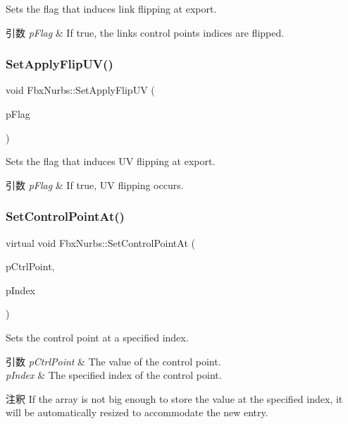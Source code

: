 Sets the flag that induces link flipping at export. 
\begin{DoxyParams}{引数}
{\em p\+Flag} & If {\ttfamily true}, the links control points indices are flipped. \\
\hline
\end{DoxyParams}
\mbox{\label{class_fbx_nurbs_ab5f463575449cbc5734258f061f3c9ba}} 
\subsubsection{\texorpdfstring{Set\+Apply\+Flip\+U\+V()}{SetApplyFlipUV()}}
{\footnotesize\ttfamily void Fbx\+Nurbs\+::\+Set\+Apply\+Flip\+UV (\begin{DoxyParamCaption}\item[{bool}]{p\+Flag }\end{DoxyParamCaption})}

Sets the flag that induces UV flipping at export. 
\begin{DoxyParams}{引数}
{\em p\+Flag} & If {\ttfamily true}, UV flipping occurs. \\
\hline
\end{DoxyParams}
\mbox{\label{class_fbx_nurbs_a46f56bfb4c6ffc90b79b2e0b81c89880}} 
\subsubsection{\texorpdfstring{Set\+Control\+Point\+At()}{SetControlPointAt()}}
{\footnotesize\ttfamily virtual void Fbx\+Nurbs\+::\+Set\+Control\+Point\+At (\begin{DoxyParamCaption}\item[{const \hyperlink{class_fbx_vector4}{Fbx\+Vector4} \&}]{p\+Ctrl\+Point,  }\item[{int}]{p\+Index }\end{DoxyParamCaption})\hspace{0.3cm}{\ttfamily [virtual]}}

Sets the control point at a specified index. 
\begin{DoxyParams}{引数}
{\em p\+Ctrl\+Point} & The value of the control point. \\
\hline
{\em p\+Index} & The specified index of the control point.\\
\hline
\end{DoxyParams}
\begin{DoxyRemark}{注釈}
If the array is not big enough to store the value at the specified index, it will be automatically resized to accommodate the new entry. 
\end{DoxyRemark}


